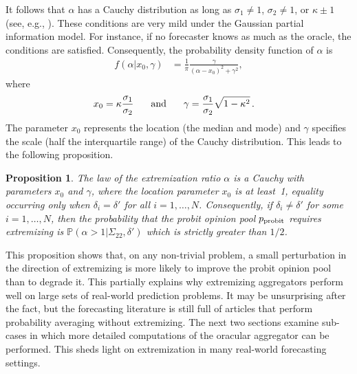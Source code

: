 \documentclass[11pt]{article}
\renewcommand{\P}{\mathbb{P}}
\newtheorem{proposition}[theorem]{Proposition}
\theoremstyle{definition}
\theoremstyle{definition}
\def\P{{\mathbb P}}
\def\probit{p_{\rm probit}}
\begin{document}
It follows that $\alpha$ has a Cauchy distribution as long as
$\sigma_1 \neq 1$, $\sigma_2 \neq 1$, or $\kappa \pm 1$ (see, e.g.,
\citealt{cedilnik2004distribution}).  These
conditions are very mild under the Gaussian partial information model.
For instance, if no forecaster knows as much as the oracle, the
conditions are satisfied.  Consequently, the probability density
function of $\alpha$ is
\begin{align*}
f(\alpha | x_0, \gamma) &= \frac{1}{\pi} 
  \frac{\gamma}{(\alpha-x_0)^2+\gamma^2}, 
\end{align*}
where 
\begin{align*}
x_0 = \kappa \frac{\sigma_1}{\sigma_2} \hspace{0.2in} \mbox{ and } 
  \hspace{0.2in} \gamma &= \frac{\sigma_1}{\sigma_2} \sqrt{1-\kappa^2} \, .
\end{align*}
The parameter $x_0$ represents the location (the median and mode) and
$\gamma$ specifies the scale (half the interquartile range) of the
Cauchy distribution. This leads to the following proposition.  

\begin{proposition}
\label{positiveProbThm}
The law of the extremization ratio $\alpha$ is a Cauchy with
parameters $x_0$ and $\gamma$, where the location parameter $x_0$ is
at least~1, equality occurring only when $\delta_i = \delta'$ for all
$i = 1, \dots, N$. Consequently, if $\delta_i \neq \delta'$ for some
$i = 1, \dots, N$, then the probability that the probit opinion pool $\probit$
requires extremizing is $\P(\alpha > 1 | \Sigma_{22}, \delta')$ which
is strictly greater than $1/2$.
\end{proposition}
\noindent
This proposition shows that, on any non-trivial problem, a small
perturbation in the direction of extremizing is more likely to improve
the probit opinion pool than to degrade it.  This partially explains
why extremizing aggregators perform well on large sets of real-world
prediction problems.  It may be unsurprising after the fact, but the
forecasting literature is still full of articles that perform
probability averaging without extremizing.  The next two sections
examine sub-cases in which more detailed computations of the oracular
aggregator can be performed. This sheds light on extremization in many
real-world forecasting settings.
\end{document}
